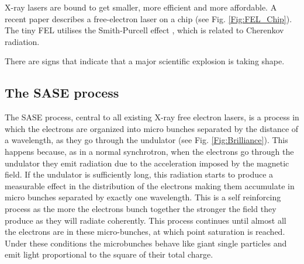 X-ray lasers are bound to get smaller, more efficient and more affordable. A
recent paper describes a free-electron laser on a chip
(see Fig. \ref{Fig:FEL_Chip}). The tiny FEL utilises the Smith-Purcell effect \cite{Smith1953Visible}, which is related to Cherenkov radiation.
 
There are signs that indicate that a major scientific explosion is taking shape.
 



\subsection{The SASE process}

The SASE process, central to all existing X-ray free electron lasers, is a
process in which the electrons are organized into micro bunches separated by the
distance of a wavelength, as they go through the undulator (see
Fig. \ref{Fig:Brilliance}). This happens because,
as in a normal synchrotron, when the electrons go through the undulator they
emit radiation due to the acceleration imposed by the magnetic field. If
the undulator is sufficiently long, this radiation starts to produce a
measurable effect in the distribution of the electrons making them accumulate in
micro bunches separated by exactly one wavelength. This is a self reinforcing
process as the more the electrons bunch together the stronger the field they
produce as they will radiate coherently. This process continues until almost all
the electrons are in these micro-bunches, at which point saturation is
reached. Under these conditions the microbunches behave like giant 
single particles and emit light proportional to the square of their total charge.

